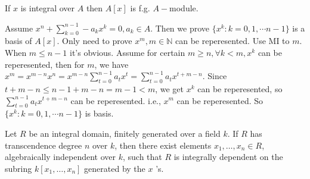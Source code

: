 \documentclass{ctexart}
\newcommand\<{\langle}
\renewcommand\>{\rangle}
\newcommand\N{\mathbb{N}}
\begin{document}
\begin{problem}
    If $x$ is integral over $A$ then $A[x]$ is f.g. $A-$module. 
\end{problem}
\begin{solution}
    Assume $x^n+\sum_{k=0}^{n-1}-a_kx^k=0,a_k\in A$. Then we prove $\{x^k:k=0,1,\cdots n-1\}$ is a basis of $A[x]$. Only need to prove $x^m,m\in \N$ can be reperesented. Use MI to $m$. When $m\leq n-1$ it's obvious. Assume for certain $m\geq n,\forall k<m,x^k$ can be reperesented, then for $m$, we have $x^m=x^{m-n}x^n=x^{m-n}\sum_{t=0}^{n-1}a_tx^t=\sum_{t=0}^{n-1}a_tx^{t+m-n}$. Since $t+m-n\leq n-1+m-n=m-1<m$, we get $x^k$ can be reperesented, so $\sum_{t=0}^{n-1}a_tx^{t+m-n}$ can be reperesented. i.e., $x^m$ can be reperesented. So $\{x^k:k=0,1,\cdots n-1\}$ is basis. 
\end{solution}

\begin{problem}
    Let $R$ be an integral domain, finitely generated over a field $k$. If $R$ has transcendence degree $n$ over $k$, then there exist elements $x_1, \ldots, x_n \in R$, algebraically independent over $k$, such that $R$ is integrally dependent on the subring $k\left[x_1, \ldots, x_n\right]$ generated by the $x$ 's.
\end{problem}
\end{document}
